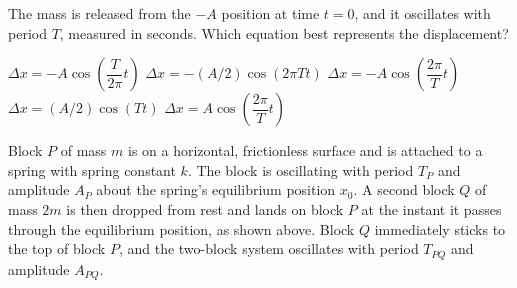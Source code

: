 \documentclass{../../../oss-ap12ibhl}
\begin{document}
\begin{questions}
  \question The mass is released from the $-A$ position at time $t=0$, and it
  oscillates with period $T$, measured in seconds. Which equation best
  represents the displacement?
  \label{four}
  \begin{choices}
    \choice $\Delta x = -A\cos\left(\dfrac{T}{2\pi}t\right)$
    \choice $\Delta x = -(A/2)\cos(2\pi T t)$
    \choice $\Delta x = -A\cos\left(\dfrac{2\pi}{T}t\right)$
    \choice $\Delta x = (A/2)\cos(T t)$
    \choice $\Delta x = A\cos\left(\dfrac{2\pi}{T}t\right)$
  \end{choices}
  \newpage
%
%
%
  \question Block $P$ of mass $m$ is on a horizontal, frictionless surface and
  is attached to a spring with spring constant $k$. The block is oscillating
  with period $T_P$ and amplitude $A_P$ about the spring's equilibrium position
  $x_0$. A second block $Q$ of mass $2m$ is then dropped from rest and lands on
  block $P$ at the instant it passes through the equilibrium position, as shown
  above. Block $Q$ immediately sticks to the top of block $P$, and the
  two-block system oscillates with period $T_{PQ}$ and amplitude $A_{PQ}$.
  \newpage


\end{questions}
\end{document}
